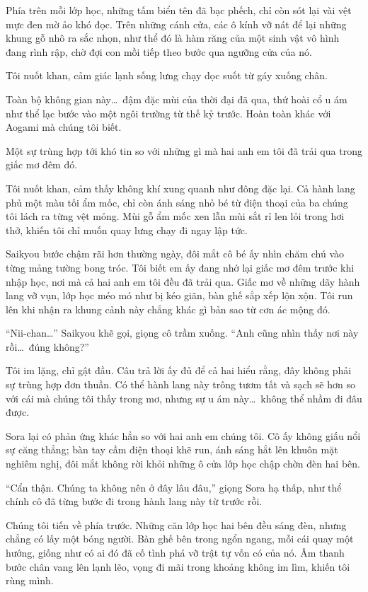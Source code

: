 \documentclass[../main.tex]{subfiles}
\begin{document}
Phía trên mỗi lớp học, những tấm biển tên đã bạc phếch, chỉ còn sót lại vài vệt mực đen mờ ảo khó đọc. Trên những cánh cửa, các ô kính vỡ nát để lại những khung gỗ nhô ra sắc nhọn, như thể đó là hàm răng của một sinh vật vô hình đang rình rập, chờ đợi con mồi tiếp theo bước qua ngưỡng cửa của nó.

Tôi nuốt khan, cảm giác lạnh sống lưng chạy dọc suốt từ gáy xuống chân.

Toàn bộ không gian này\dots\ đậm đặc mùi của thời đại đã qua, thứ hoài cổ u ám như thể lạc bước vào một ngôi trường từ thế kỷ trước. Hoàn toàn khác với Aogami mà chúng tôi biết.

Một sự trùng hợp tới khó tin so với những gì mà hai anh em tôi đã trải qua trong giấc mơ đêm đó.

Tôi nuốt khan, cảm thấy không khí xung quanh như đông đặc lại. Cả hành lang phủ một màu tối ẩm mốc, chỉ còn ánh sáng nhỏ bé từ điện thoại của ba chúng tôi lách ra từng vệt mỏng. Mùi gỗ ẩm mốc xen lẫn mùi sắt rỉ len lỏi trong hơi thở, khiến tôi chỉ muốn quay lưng chạy đi ngay lập tức.

Saikyou bước chậm rãi hơn thường ngày, đôi mắt cô bé ấy nhìn chăm chú vào từng mảng tường bong tróc. Tôi biết em ấy đang nhớ lại giấc mơ đêm trước khi nhập học, nơi mà cả hai anh em tôi đều đã trải qua. Giấc mơ về những dãy hành lang vỡ vụn, lớp học méo mó như bị kéo giãn, bàn ghế sắp xếp lộn xộn. Tôi run lên khi nhận ra khung cảnh này chẳng khác gì bản sao từ cơn ác mộng đó.

``Nii-chan\dots'' Saikyou khẽ gọi, giọng cô trầm xuống. ``Anh cũng nhìn thấy nơi này rồi\dots\ đúng không?''

Tôi im lặng, chỉ gật đầu. Câu trả lời ấy đủ để cả hai hiểu rằng, đây không phải sự trùng hợp đơn thuần. Có thể hành lang này trông tươm tất và sạch sẽ hơn so với cái mà chúng tôi thấy trong mơ, nhưng sự u ám này\dots\ không thể nhầm đi đâu được.

Sora lại có phản ứng khác hẳn so với hai anh em chúng tôi. Cô ấy không giấu nổi sự căng thẳng; bàn tay cầm điện thoại khẽ run, ánh sáng hắt lên khuôn mặt nghiêm nghị, đôi mắt không rời khỏi những ô cửa lớp học chập chờn đèn hai bên.

``Cẩn thận. Chúng ta không nên ở đây lâu đâu,'' giọng Sora hạ thấp, như thể chính cô đã từng bước đi trong hành lang này từ trước rồi.

Chúng tôi tiến về phía trước. Những căn lớp học hai bên đều sáng đèn, nhưng chẳng có lấy một bóng người. Bàn ghế bên trong ngổn ngang, mỗi cái quay một hướng, giống như có ai đó đã cố tình phá vỡ trật tự vốn có của nó. Âm thanh bước chân vang lên lạnh lẽo, vọng đi mãi trong khoảng không im lìm, khiến tôi rùng mình.
\end{document}
